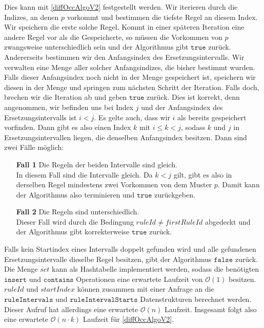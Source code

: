 Dies kann mit \autoref{diffOccAlgoV2} festgestellt werden.
Wir iterieren durch die Indizes, an denen $p$ vorkommt und bestimmen die tiefste Regel an diesem Index. Wir speichern die erste solche Regel. Kommt in einer späteren Iteration eine andere Regel vor als die Gespeicherte, so müssen die Vorkommen von $p$ zwangsweise unterschiedlich sein und der Algorithmus gibt $\texttt{true}$ zurück.
Andererseits bestimmen wir den Anfangsindex des Ersetzungsintervalls. Wir verwalten eine Menge aller solcher Anfangsindizes, die bisher bestimmt wurden. 
Falls dieser Anfangsindex noch nicht in der Menge gespeichert ist, speichern wir diesen in der Menge und springen zum nächsten Schritt der Iteration. Falls doch, brechen wir die Iteration ab und geben $\texttt{true}$ zurück. 
Dies ist korrekt, denn angenommen, wir befinden uns bei Index $j$ und der Anfangsindex des Ersetzungsintervalls ist $i < j$. Es gelte auch, dass wir $i$ als bereits gespeichert vorfinden. Dann gibt es also einen Index $k$ mit $i \leq k < j$, sodass $k$ und $j$ in Ersetzungsintervallen liegen, die denselben Anfangsindex besitzen. Dann sind zwei Fälle möglich:

\begin{enumerate}
	\item[\textbf{Fall 1}] Die Regeln der beiden Intervalle sind gleich.\\
	In diesem Fall sind die Intervalle gleich. Da $k < j$ gilt, gibt es also in derselben Regel mindestens zwei Vorkommen von dem Muster $p$. Damit kann der Algorithmus also terminieren und $\texttt{true}$ zurückgeben.
	\item[\textbf{Fall 2}] Die Regeln sind unterschiedlich.\\
	Dieser Fall wird durch die Bedingung $ruleId \neq firstRuleId$ abgedeckt und der Algorithmus gibt korrekterweise $\texttt{true}$ zurück.
\end{enumerate}

Falls kein Startindex eines Intervalls doppelt gefunden wird und alle gefundenen Ersetzungsintervalle dieselbe Regel besitzen, gibt der Algorithmus $\texttt{false}$ zurück.
Die Menge $set$ kann als Hashtabelle implementiert werden, sodass die benötigten $\texttt{insert}$ und $\texttt{contains}$ Operationen eine erwartete Laufzeit von $\mathcal{O}(1)$ besitzen. $ruleId$ und $startIndex$ können zusammen mit einer Anfrage an die $\texttt{ruleIntervals}$ und $\texttt{ruleIntervalStarts}$ Datenstrukturen berechnet werden. Dieser Aufruf hat allerdings eine erwartete $\mathcal{O}(n)$ Laufzeit. Insgesamt folgt also eine erwartete $\mathcal{O}(n \cdot k)$ Laufzeit für \autoref{diffOccAlgoV2}.

